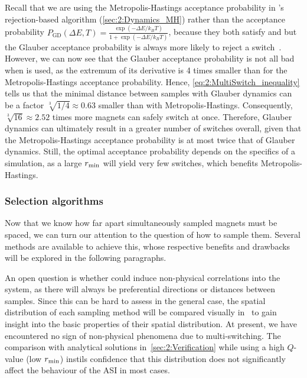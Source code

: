 Recall that we are using the Metropolis-Hastings acceptance probability in \hotspice's rejection-based  algorithm (\cref{sec:2:Dynamics_MH}) rather than the  acceptance probability $P_\mathrm{GD}(\Delta E, T) = \frac{\exp(-\Delta E/k_B T)}{1+\exp(-\Delta E/k_B T)}$, because they both satisfy  and  but the Glauber acceptance probability is always more likely to reject a switch~\cite{bit-player_MCvsGlauber}.
However, we can now see that the Glauber acceptance probability is not all bad when  is used, as the extremum of its derivative is 4 times smaller than for the Metropolis-Hastings acceptance probability.
Hence, \cref{eq:2:MultiSwitch_inequality} tells us that the minimal distance between samples with Glauber dynamics can be a factor $\sqrt[3]{1/4} \approx 0.63$ smaller than with Metropolis-Hastings.
Consequently, $\sqrt[3]{16} \approx 2.52$ times more magnets can safely switch at once.
Therefore, Glauber dynamics can ultimately result in a greater number of switches overall, given that the Metropolis-Hastings acceptance probability is at most twice that of Glauber dynamics. Still, the optimal acceptance probability depends on the specifics of a simulation, as a large $r_\mathrm{min}$ will yield very few switches, which benefits Metropolis-Hastings.

\subsubsection{Selection algorithms}\label{sec:2:MultiSwitch:Algorithms}
Now that we know how far apart simultaneously sampled magnets must be spaced, we can turn our attention to the question of how to sample them.
Several methods are available to achieve this, whose respective benefits and drawbacks will be explored in the following paragraphs. \par
An open question is whether  could induce non-physical correlations into the system, as there will always be preferential directions or distances between samples.
Since this can be hard to assess in the general case, the spatial distribution of each sampling method will be compared visually in~ to gain insight into the basic properties of their spatial distribution.
At present, we have encountered no sign of non-physical phenomena due to multi-switching.
The comparison with analytical solutions in~\cref{sec:2:Verification} while using a high $Q$-value (low $r_\mathrm{min}$) instils confidence that this distribution does not significantly affect the behaviour of the ASI in most cases.

